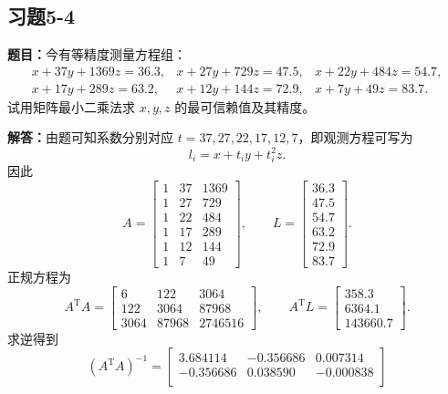 \documentclass[UTF8,zihao=-4]{ctexart}
\newcommand{\problem}[1]{\subsection*{#1}}
\newcommand{\timu}{\noindent\textbf{题目：}}
\newcommand{\jieda}{\noindent\textbf{解答：}}
\begin{document}
{\problem{习题5-4}
\timu 今有等精度测量方程组：
\begin{equation*}
\begin{array}{lll}
    x+37y+1369z=36.3, & x+27y+729z=47.5, & x+22y+484z=54.7,\\
    x+17y+289z=63.2, & x+12y+144z=72.9, & x+7y+49z=83.7.
\end{array}
\end{equation*}
试用矩阵最小二乘法求 $x,y,z$ 的最可信赖值及其精度。

\jieda 由题可知系数分别对应 $t=37,27,22,17,12,7$，即观测方程可写为
\begin{equation*}
    l_i=x+t_i y+t_i^2 z.
\end{equation*}
因此
\begin{equation*}
    A=\begin{bmatrix}
        1&37&1369\\
        1&27&729\\
        1&22&484\\
        1&17&289\\
        1&12&144\\
        1&7&49
    \end{bmatrix},\qquad
    L=\begin{bmatrix}36.3\\47.5\\54.7\\63.2\\72.9\\83.7\end{bmatrix}.
\end{equation*}
正规方程为
\begin{equation*}
    A^{\mathrm T}A=\begin{bmatrix}
        6&122&3064\\
        122&3064&87968\\
        3064&87968&2746516
    \end{bmatrix},
    \qquad
    A^{\mathrm T}L=\begin{bmatrix}
        358.3\\6364.1\\143660.7
    \end{bmatrix}.
\end{equation*}
求逆得到
\begin{equation*}
    (A^{\mathrm T}A)^{-1}=\begin{bmatrix}
        3.684114&-0.356686&0.007314\\
        -0.356686&0.038590&-0.000838\\

\end{bmatrix}
\end{equation*}}
\end{document}
